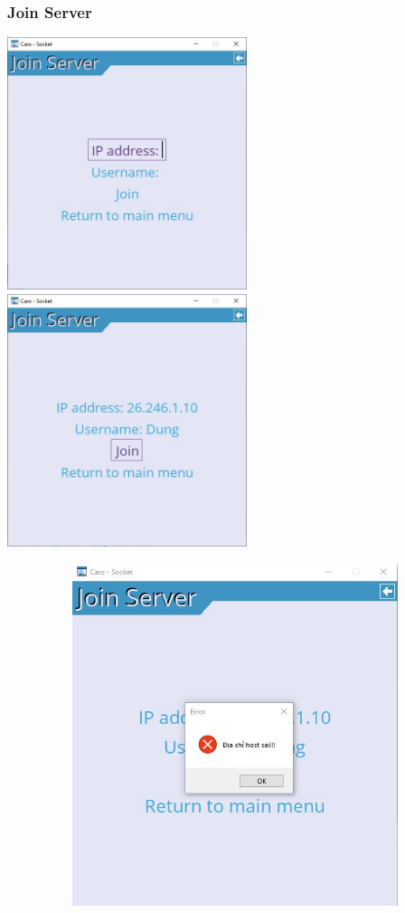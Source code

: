 \documentclass[a4paper]{article}
\begin{document}
\subsubsection{Join Server}
\includegraphics[width=7cm]{images/app/join_server1.png}
\includegraphics[width=7cm]{images/app/join_server2.png}

\includegraphics[width=13.5cm, height=10cm]{images/app/join_server3.png}
\end{document}
